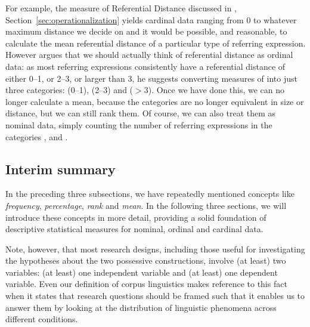 For example, the measure  of Referential Distance  discussed in , Section~\ref{sec:operationalization} yields cardinal  data ranging from 0 to whatever maximum distance we decide on and it would be possible, and reasonable, to calculate the mean  referential distance of a particular type of referring expression. However \citet[20f]{givon_grammar_1992} argues that we should actually think of referential distance  as ordinal  data: as most referring expressions consistently have a referential distance of either 0--1, or 2--3, or larger than 3, he suggests converting measures  of   into just three categories:   (0--1),  (2--3) and  ($>3$). Once we have done this, we can no longer calculate a mean,  because the categories  are no longer equivalent in size or distance,  but we can still rank them. Of course, we can also treat them as nominal  data, simply counting the number of referring expressions in the categories  ,  and .

\subsection{Interim summary}
\label{sec:datatypesinterim}

In the preceding three subsections, we have repeatedly mentioned concepts like \textit{frequency},  \textit{percentage}, \textit{rank} and \textit{mean}.  In the following three sections, we will introduce these concepts in more detail, providing a solid foundation of descriptive  statistical measures for nominal,  ordinal  and cardinal  data.

Note, however, that most research designs,  including those useful for investigating the hypotheses  about the two possessive  constructions, involve (at least) two variables: (at least) one independent variable and (at least) one dependent variable. Even our definition of corpus linguistics makes reference to this fact when it states that research questions should be framed such that it enables us to answer them by looking at the distribution  of linguistic phenomena across different conditions.

